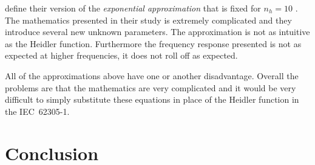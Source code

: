 \citeauthor{Vujevic2009} define their version of the \textit{exponential approximation} that is fixed for $n_h=10$ \cite{Vujevic2009,Vujevic2010a}. The mathematics presented in their study is extremely complicated and they introduce several new unknown parameters. The approximation is not as intuitive as the Heidler function. Furthermore the frequency response presented is not as expected at higher frequencies, it does not roll off as expected.

All of the approximations above have one or another disadvantage. Overall the problems are that the mathematics are very complicated and it would be very difficult to simply substitute these equations in place of the Heidler function in the IEC~62305-1.


\section{Conclusion}
\label{sec:background_conclusion}
